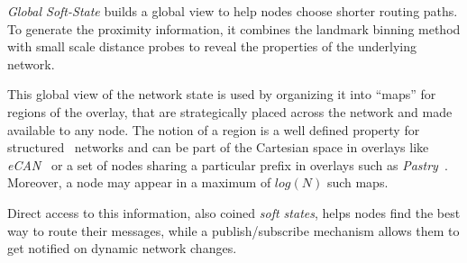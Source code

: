 \emph{Global Soft-State} \cite{XTZ2003} builds a global view to help nodes
choose shorter routing paths. To generate the proximity information, it 
combines the landmark binning method with small
scale distance probes to reveal the properties 
of the underlying network. 

This global view of the network state is used by organizing it into ``maps'' for
regions of the overlay, that are strategically placed
across the network and made available to any node. The notion of a
region is a well defined property for structured \p\ networks and can be part of
the Cartesian space in overlays like \emph{eCAN}~\cite{xu_ecan_2002} or a set of
nodes sharing a particular prefix in overlays such as
\emph{Pastry}~\cite{antony_pastry_2001}. Moreover, a node may appear in a maximum
of $log(N)$ such maps.

Direct access to this information, also coined \emph{soft states}, helps nodes
find the best way to route their messages, while a publish/subscribe mechanism
allows them to get notified on dynamic network changes.

